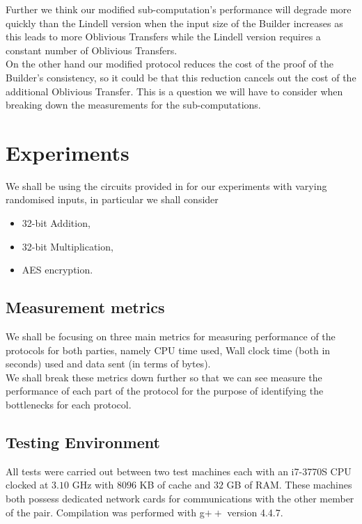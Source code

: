 \documentclass[ %
                    author={Nicholas Tutte},
                supervisor={Prof. Nigel Smart},
                    degree={MEng},
                     title={Secure Two Party Computation},
                  subtitle={A practical comparison of recent protocols},
                      type={Research - GG1K},
                      year={2015} ]{dissertation}
\begin{document}
				Further we think our modified sub-computation's performance will degrade more quickly than the Lindell version when the input size of the Builder increases as this leads to more Oblivious Transfers while the Lindell version requires a constant number of Oblivious Transfers.\\

				On the other hand our modified protocol reduces the cost of the proof of the Builder's consistency, so it could be that this reduction cancels out the cost of the additional Oblivious Transfer. This is a question we will have to consider when breaking down the measurements for the sub-computations.

	\chapter{Experiments} \label{sec:Results}
		We shall be using the circuits provided in \cite{NigelCircuits} for our experiments with varying randomised inputs, in particular we shall consider
		
		\begin{itemize}
			\setlength\itemsep{0.2em}
			\item 32-bit Addition,
			\item 32-bit Multiplication,
			\item AES encryption.
		\end{itemize} \vspace{-0.9cm}

		\section{Measurement metrics}
			We shall be focusing on three main metrics for measuring performance of the protocols for both parties, namely CPU time used, Wall clock time (both in seconds) used and data sent (in terms of bytes).\\

			We shall break these metrics down further so that we can see measure the performance of each part of the protocol for the purpose of identifying the bottlenecks for each protocol.

		\section{Testing Environment}
			All tests were carried out between two test machines each with an i7-3770S CPU clocked at $3.10$ GHz with $8096$ KB of cache and $32$ GB of RAM. These machines both possess dedicated network cards for communications with the other member of the pair. Compilation was performed with g$++$ version 4.4.7. 
\end{document}
